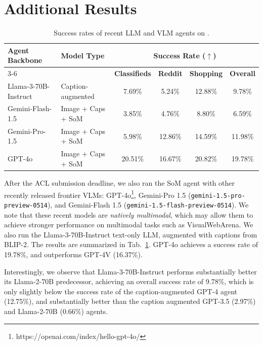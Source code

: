 \section{Additional Results} \label{sec:additional_reuslts}

\begin{table}[t]
\centering
\begin{tabular}{@{}llcccc@{}}
\toprule
\multirow{2}{*}{\textbf{Agent Backbone}}  & \multirow{2}{*}{\textbf{Model Type}} & \multicolumn{4}{c}{\textbf{Success Rate ($\uparrow$)}} \\
\cmidrule(lr){3-6}
&  & \textbf{Classifieds} & \textbf{Reddit} & \textbf{Shopping} & \textbf{Overall} \\
\midrule
Llama-3-70B-Instruct &  Caption-augmented & 7.69\% & 5.24\% & 12.88\% &  9.78\% \\ 
Gemini-Flash-1.5 &  Image + Caps + SoM & 3.85\% & 4.76\% & 8.80\% &  6.59\% \\ 
Gemini-Pro-1.5 & Image + Caps + SoM & 5.98\% & 12.86\% & 14.59\% &  11.98\% \\ 
GPT-4o &  Image + Caps + SoM &  20.51\% &  16.67\% & 20.82\% & 19.78\%  \\ 
\bottomrule
\end{tabular}
\caption{Success rates of recent LLM and VLM agents on \BenchmarkName{}.}  \label{tab:additional_results}
\end{table}


After the ACL submission deadline, we also ran the SoM agent with other recently released frontier VLMs: GPT-4o\footnote{https://openai.com/index/hello-gpt-4o/}, Gemini-Pro 1.5 (\texttt{gemini-1.5-pro-preview-0514}), and Gemini-Flash 1.5 (\texttt{gemini-1.5-flash-preview-0514}). We note that these recent models are \textit{natively multimodal}, which may allow them to achieve stronger performance on multimodal tasks such as VisualWebArena. We also run the Llama-3-70B-Instruct text-only LLM, augmented with captions from BLIP-2. The results are summarized in Tab.~\ref{tab:additional_results}. GPT-4o achieves a success rate of 19.78\%, and outperforms GPT-4V (16.37\%).

Interestingly, we observe that Llama-3-70B-Instruct performs substantially better its Llama-2-70B predecessor, achieving an overall success rate of 9.78\%, which is only slightly below the success rate of the caption-augmented GPT-4 agent (12.75\%), and substantially better than the caption augmented GPT-3.5 (2.97\%) and Llama-2-70B (0.66\%) agents.


